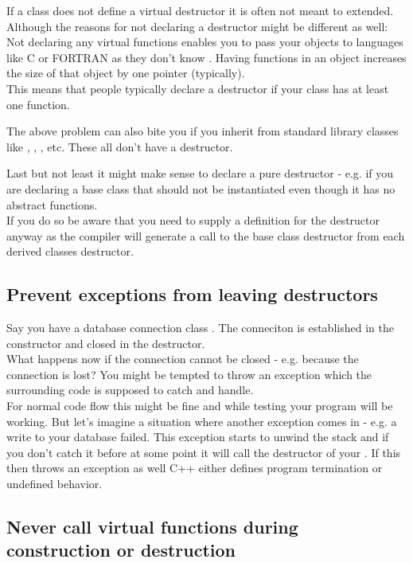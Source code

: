 \documentclass[a4paper, twocolumn]{article}
\let\oldsubsection\subsection
\newcounter{mysubsection}
\renewcommand{\subsection}{
    \stepcounter{mysubsection}
    \oldsubsection
}
\newcommand{\code}[1]{\texttt{\color{black}{#1}}}
\begin{document}
If a class does not define a virtual destructor it is often not meant to extended. Although the reasons for not declaring a \code{virtual} destructor might be different as well:\\
Not declaring any virtual functions enables you to pass your objects to languages like C or FORTRAN as they don't know \code{virtual}. Having \code{virtual} functions in an object increases the size of that object by one pointer (typically).\\
This means that people typically declare a \code{virtual} destructor if your class has at least one \code{virtual} function.

The above problem can also bite you if you inherit from standard library classes like \code{string}, \code{vector}, \code{map}, etc. These all don't have a \code{virtual} destructor.

Last but not least it might make sense to declare a pure \code{virtual} destructor - e.g. if you are declaring a base class that should not be instantiated even though it has no abstract functions.\\
If you do so be aware that you need to supply a definition for the destructor anyway as the compiler will generate a call to the base class destructor from each derived classes destructor.

\subsection{Prevent exceptions from leaving destructors}
Say you have a database connection class \code{DbConnection}. The conneciton is established in the constructor and closed in the destructor.\\
What happens now if the connection cannot be closed - e.g. because the connection is lost? You might be tempted to throw an exception which the surrounding code is supposed to catch and handle.\\
For normal code flow this might be fine and while testing your program will be working. But let's imagine a situation where another exception comes in - e.g. a write to your database failed.
This exception starts to unwind the stack and if you don't catch it before at some point it will call the destructor of your \code{DbConnection}. If this then throws an exception as well C++ either defines program termination or undefined behavior.\\


\subsection{Never call virtual functions during construction or destruction}
\end{document}

